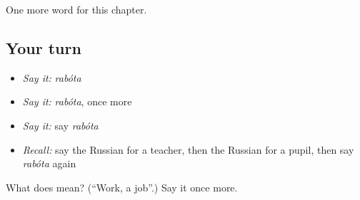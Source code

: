 \begin{grammarlens}[title={What you've built}]
One more word for this chapter.
\end{grammarlens}

\subsection*{Your turn}
\begin{itemize}
\raggedright
  \item \emph{Say it:} \emph{rabóta}
  \item \emph{Say it:} \emph{rabóta}, once more
  \item \emph{Say it:} say \emph{rabóta}
  \item \emph{Recall:} say the Russian for a teacher, then the Russian for a pupil, then say \emph{rabóta} again
\end{itemize}

\begin{tcolorbox}[breakable,colback=teal!4,colframe=teal!35!black,title={Before you move on}]
What does  mean? (\textquotedblleft{}Work, a job\textquotedblright{}.) Say it once more.
\end{tcolorbox}
